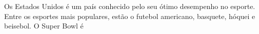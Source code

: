 Os Estados Unidos é um país conhecido pelo seu ótimo desempenho no esporte. Entre os esportes mais populares, estão o futebol americano, basquete, hóquei e beisebol. O Super Bowl é 
